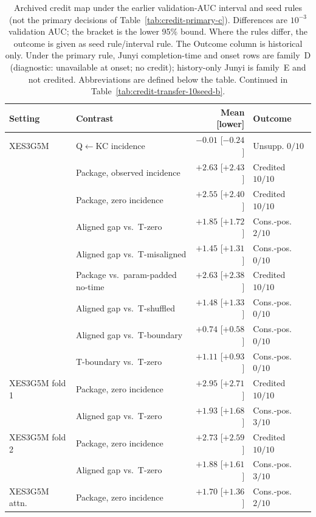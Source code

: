 \begin{table}[tbp]
\caption{Archived credit map under the earlier validation-AUC interval
and seed rules (not the primary decisions of
Table~\ref{tab:credit-primary-c}). Differences are $10^{-3}$ validation
AUC; the bracket is the lower 95\% bound. Where the rules differ, the
outcome is given as seed rule/interval rule. The Outcome column is
historical only. Under the primary rule, Junyi completion-time and
onset rows are family~D (diagnostic: unavailable at onset; no credit);
history-only Junyi is family~E and not credited. Abbreviations are
defined below the table. Continued in
Table~\ref{tab:credit-transfer-10seed-b}.}
\label{tab:credit-transfer-10seed}
\centering
\scriptsize
\setlength{\tabcolsep}{3pt}
\renewcommand{\arraystretch}{0.84}
\begin{tabular}{@{}llrl@{}}
\toprule
Setting & Contrast & Mean [lower] & Outcome \\
\midrule
XES3G5M & Q$\leftarrow$KC incidence & $-0.01$ [$-0.24$] & Unsupp. $0/10$ \\
 & Package, observed incidence & $+2.63$ [$+2.43$] & Credited $10/10$ \\
 & Package, zero incidence & $+2.55$ [$+2.40$] & Credited $10/10$ \\
 & Aligned gap vs.\ T-zero & $+1.85$ [$+1.72$] & Cons.-pos. $2/10$ \\
 & Aligned gap vs.\ T-misaligned & $+1.45$ [$+1.31$] & Cons.-pos. $0/10$ \\
 & Package vs.\ param-padded no-time & $+2.63$ [$+2.38$] & Credited $10/10$ \\
 & Aligned gap vs.\ T-shuffled & $+1.48$ [$+1.33$] & Cons.-pos. $0/10$ \\
 & Aligned gap vs.\ T-boundary & $+0.74$ [$+0.58$] & Cons.-pos. $0/10$ \\
 & T-boundary vs.\ T-zero & $+1.11$ [$+0.93$] & Cons.-pos. $0/10$ \\
\addlinespace[1pt]
XES3G5M fold 1 & Package, zero incidence & $+2.95$ [$+2.71$] & Credited $10/10$ \\
 & Aligned gap vs.\ T-zero & $+1.93$ [$+1.68$] & Cons.-pos. $3/10$ \\
\addlinespace[1pt]
XES3G5M fold 2 & Package, zero incidence & $+2.73$ [$+2.59$] & Credited $10/10$ \\
 & Aligned gap vs.\ T-zero & $+1.88$ [$+1.61$] & Cons.-pos. $3/10$ \\
\addlinespace[1pt]
XES3G5M attn. & Package, zero incidence & $+1.70$ [$+1.36$] & Cons.-pos. $2/10$ \\

\end{tabular}
\end{table}
